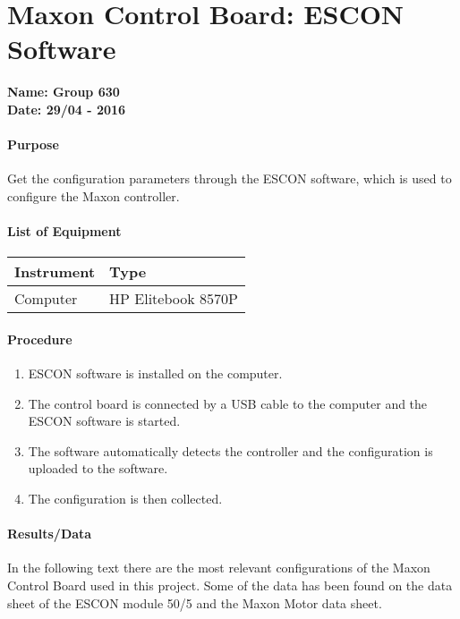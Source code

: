 \chapter{Maxon Control Board: ESCON Software}\label{MaxonControlESCON} 
\textbf{Name: Group 630}\\
\textbf{Date: 29/04 - 2016}

\subsubsection{Purpose}
Get the configuration parameters through the ESCON software, which is used to configure the Maxon controller.  

\subsubsection{List of Equipment}
\begin{table}[H]
	\begin{tabular}{|p{10cm}|p{4cm}|}
		\hline%
		\textbf{Instrument}                &  \textbf{Type} \\
		\hline%
		Computer                           &  HP Elitebook 8570P  \\
		\hline%
	\end{tabular}
\end{table}

\subsubsection{Procedure}
\begin{enumerate}
  \item ESCON software is installed on the computer.
  \item The control board is connected by a USB cable to the computer and the ESCON software is started.
  \item The software automatically detects the controller and the configuration is uploaded to the software.
  \item The configuration is then collected.
\end{enumerate}

\subsubsection{Results/Data}
In the following text there are the most relevant configurations of the Maxon Control Board used in this project. Some of the data has been found on the data sheet of the ESCON module 50/5 and the Maxon Motor data sheet.

